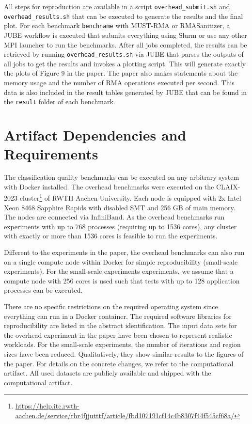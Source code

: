 \documentclass[twoside]{article}
\begin{document}
All steps for reproduction are available in a script \texttt{overhead\_submit.sh} and \texttt{overhead\_results.sh} that can be executed to generate the results and the final plot.
For each benchmark \texttt{benchname} with MUST-RMA or RMASanitizer, a JUBE workflow is executed that submits everything using Slurm or use any other MPI launcher to run the benchmarks.
After all jobs completed, the results can be retrieved by running \texttt{overhead\_results.sh} via JUBE that parses the outputs of all jobs to get the results and invokes a plotting script.
This will generate exactly the plots of Figure 9 in the paper.
The paper also makes statements about the memory usage and the number of RMA operations executed per second.
This data is also included in the result tables generated by JUBE that can be found in the \texttt{result} folder of each benchmark.

\section*{Artifact Dependencies and Requirements}
The classification quality benchmarks can be executed on any arbitrary system with Docker installed.
The overhead benchmarks were executed on the CLAIX-2023 cluster\footnote{\url{https://help.itc.rwth-aachen.de/service/rhr4fjjutttf/article/fbd107191cf14c4b8307f44f545cf68a/}} of RWTH Aachen University. Each node is equipped with 2x Intel Xeon 8468 Sapphire Rapids with disabled SMT and 256 GB of main memory. The nodes are connected via InfiniBand. As the overhead benchmarks run experiments with up to 768 processes (requiring up to 1536 cores), any cluster with exactly or more than 1536 cores is feasible to run the experiments.

Different to the experiments in the paper, the overhead benchmarks can also run on a single compute node within Docker for simple reproducibility (small-scale experiments).
For the small-scale experiments experiments, we assume that a compute node with 256 cores is used such that tests with up to 128 application processes can be executed.

There are no specific restrictions on the required operating system since everything can run in a Docker container. The required software libraries for reproducibility are listed in the abstract identification.
The input data sets for the overhead experiment in the paper have been chosen to represent realistic workloads.
For the small-scale experiments, the number of iterations and region sizes have been reduced.
Qualitatively, they show similar results to the figures of the paper.
For details on the concrete changes, we refer to the computational artifact.
All used datasets are publicly available and shipped with the computational artifact.
\end{document}
